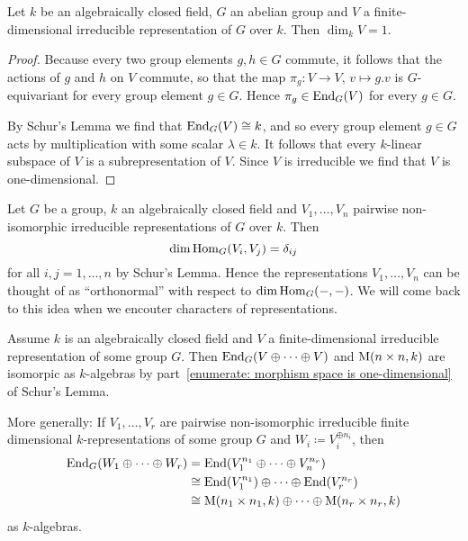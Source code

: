 \begin{corollary}
  \label{corollary: irreducible representation of abelian groups}
  Let $k$ be an algebraically closed field, $G$ an abelian group and $V$ a finite-dimensional irreducible representation of $G$ over $k$.
  Then $\dim_k V = 1$.
\end{corollary}
\begin{proof}
  Because every two group elements $g, h \in G$ commute, it follows that the actions of $g$ and $h$ on $V$ commute, so that the map $\pi_g \colon V \to V$, $v \mapsto g.v$ is $G$-equivariant for every group element $g \in G$.
  Hence $\pi_g \in \operatorname{End}_G(V)$ for every $g \in G$.
  
  By Schur’s Lemma we find that $\operatorname{End}_G(V) \cong k$, and so every group element $g \in G$ acts by multiplication with some scalar $\lambda \in k$.
  It follows that every $k$-linear subspace of $V$ is a subrepresentation of $V$.
  Since $V$ is irreducible we find that $V$ is one-dimensional.
\end{proof}


\begin{remark}
  Let $G$ be a group, $k$ an algebraically closed field and $V_1, \dotsc, V_n$ pairwise non-isomorphic irreducible representations of $G$ over $k$.
  Then
  \[
      \dim \operatorname{Hom}_G(V_i, V_j)
    = \delta_{ij}
  \]
  for all $i,j = 1, \dotsc, n$ by Schur’s Lemma.
  Hence the representations $V_1, \dotsc, V_n$ can be thought of as “orthonormal” with respect to $\dim \operatorname{Hom}_G(-,-)$.
  We will come back to this idea when we encouter characters of representations.
\end{remark}


\begin{remark}
  Assume $k$ is an algebraically closed field and $V$ a finite-dimensional irreducible representation of some group $G$.
  Then $\operatorname{End}_G(V \oplus \dotsb \oplus V)$ and $\operatorname{M}(n \times n, k)$ are isomorpic as $k$-algebras by part~\ref{enumerate: morphism space is one-dimensional} of Schur’s Lemma.
  
  More generally:
  If $V_1, \dotsc, V_r$ are pairwise non-isomorphic irreducible finite dimensional $k$-representations of some group $G$ and $W_i \coloneqq V_i^{\oplus n_i}$, then
  \begin{align*}
            \operatorname{End}_G(W_1 \oplus \dotsb \oplus W_r)
    &=      \operatorname{End}(V_1^{n_1} \oplus \dotsb \oplus V_n^{n_r})
    \\
    &\cong  \operatorname{End}(V_1^{n_1}) \oplus \dotsb \oplus \operatorname{End}(V_r^{n_r})
    \\
    &\cong  \operatorname{M}(n_1 \times n_1, k) \oplus \dotsb \oplus \operatorname{M}(n_r \times n_r, k)
  \end{align*}
  as $k$-algebras.
\end{remark}


